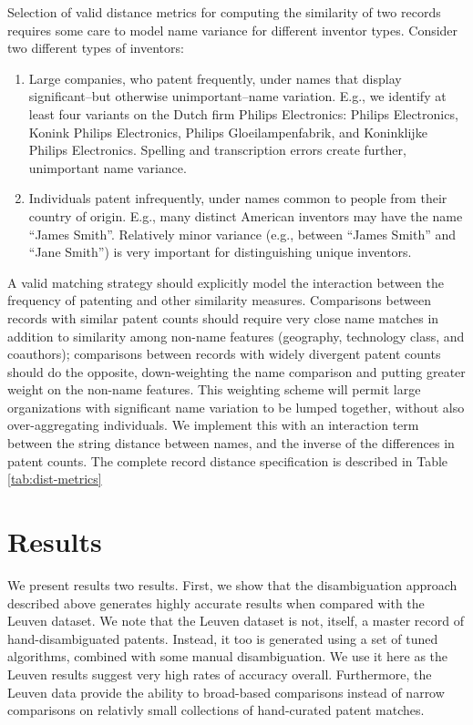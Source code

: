 \documentclass[11pt]{article}
\begin{document}
Selection of valid distance metrics for computing the similarity of
two records requires some care to model name variance for different
inventor types. Consider two different types of inventors:

\begin{enumerate}
\item Large companies, who patent frequently, under names that display
  significant--but otherwise unimportant--name variation. E.g., we
  identify at least four variants on the Dutch firm Philips
  Electronics: Philips Electronics, Konink Philips Electronics, Philips
Gloeilampenfabrik, and Koninklijke Philips Electronics. Spelling and
transcription errors create further, unimportant name variance.
\item Individuals patent infrequently, under names common
  to people from their country of origin. E.g., many distinct American
  inventors may have the name ``James Smith''. Relatively minor
  variance (e.g., between ``James Smith'' and ``Jane Smith'') is very
  important for distinguishing unique inventors.
\end{enumerate}

A valid matching strategy should explicitly model the interaction between
the frequency of patenting and other similarity measures. Comparisons
between records with similar patent counts should require very close name
matches in addition to similarity among non-name features (geography,
technology class, and coauthors); comparisons between records with
widely divergent patent counts should do the opposite, down-weighting
the name comparison and putting greater weight on the non-name
features. This weighting scheme will permit large organizations with
significant name variation to be lumped together, without also
over-aggregating individuals. We implement this with an interaction
term between the string distance between names, and the inverse of the
differences in patent counts. The complete record distance specification
is described in Table \ref{tab:dist-metrics}



\section{Results}
\label{sec:results}


We present results two results. First, we show that the disambiguation
approach described above generates highly accurate results when
compared with the Leuven dataset. We note that the Leuven dataset is
not, itself, a master record of hand-disambiguated patents. Instead,
it too is generated using a set of tuned algorithms, combined with
some manual disambiguation. We use it here as the Leuven results
suggest very high rates of accuracy overall. Furthermore, the Leuven
data provide the ability to broad-based comparisons instead of narrow
comparisons on relativly small collections of hand-curated patent
matches.
\end{document}
